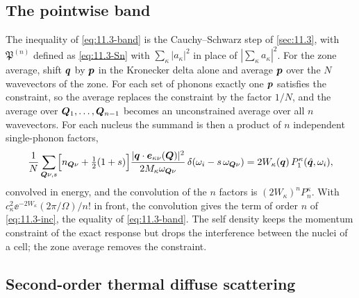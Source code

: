 \subsection{The pointwise band}

The inequality of \cref{eq:11.3-band} is the Cauchy--Schwarz step of \cref{sec:11.3}, with $\mathfrak{P}^{(n)}$ defined as \cref{eq:11.3-Sn} with $\sum_\kappa|a_\kappa|^2$ in place of $|\sum_\kappa a_\kappa|^2$. For the zone average, shift $\bm{q}$ by $\bm{p}$ in the Kronecker delta alone and average $\bm{p}$ over the $N$ wavevectors of the zone. For each set of phonons exactly one $\bm{p}$ satisfies the constraint, so the average replaces the constraint by the factor $1/N$, and the average over $\bm{Q}_1, \ldots, \bm{Q}_{n-1}$ becomes an unconstrained average over all $n$ wavevectors. For each nucleus the summand is then a product of $n$ independent single-phonon factors,
\begin{equation*}
  \frac1N\sum_{\bm{Q}\nu,s}\Bigl[n_{\bm{Q}\nu} + \tfrac12(1 + s)\Bigr]\frac{|\bm{q}\cdot\bm{e}_{\kappa\nu}(\bm{Q})|^2}{2M_\kappa\omega_{\bm{Q}\nu}}\,\delta(\omega_i - s\,\omega_{\bm{Q}\nu}) = 2W_\kappa(\bm{q})\,P^\kappa_1(\hat{\bm{q}},\omega_i) ,
\end{equation*}
convolved in energy, and the convolution of the $n$ factors is $(2W_\kappa)^nP^\kappa_n$. With $c_\kappa^2\ee^{-2W_\kappa}(2\pi/\Omega)/n!$ in front, the convolution gives the term of order $n$ of \cref{eq:11.3-inc}, the equality of \cref{eq:11.3-band}. The self density keeps the momentum constraint of the exact response but drops the interference between the nuclei of a cell; the zone average removes the constraint.

\subsection{Second-order thermal diffuse scattering}


